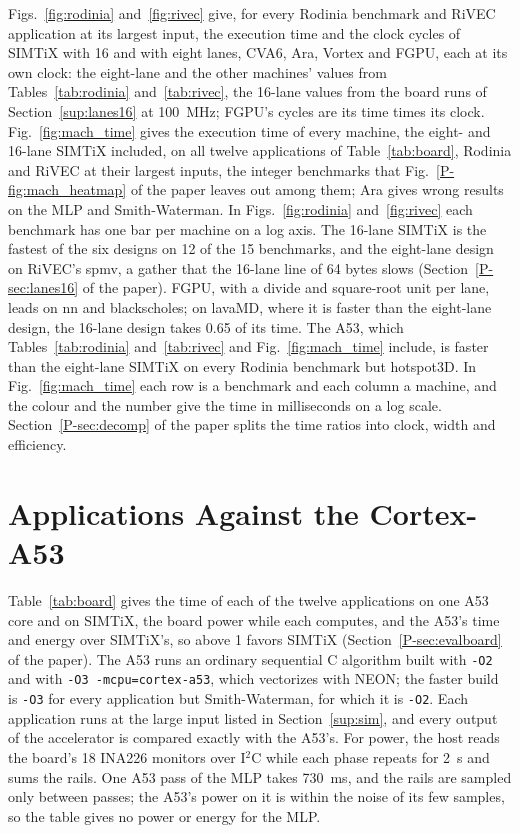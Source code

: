 \documentclass[journal]{IEEEtran}
\begin{document}
Figs.~\ref{fig:rodinia} and~\ref{fig:rivec} give, for every Rodinia benchmark and
RiVEC application at its largest input, the execution time and the clock cycles of
SIMTiX with 16 and with eight lanes, CVA6, Ara, Vortex and FGPU, each at its own clock:
the eight-lane and the other machines' values from Tables~\ref{tab:rodinia}
and~\ref{tab:rivec}, the 16-lane values from the board runs of
Section~\ref{sup:lanes16} at 100~MHz; FGPU's cycles are its time times its clock. Fig.~\ref{fig:mach_time} gives the execution time of every
machine, the eight- and 16-lane SIMTiX included, on all twelve applications of
Table~\ref{tab:board}, Rodinia and RiVEC at their largest inputs, the integer
benchmarks that Fig.~\ref{P-fig:mach_heatmap} of the paper leaves out among them; Ara
gives wrong results on the MLP and Smith-Waterman.
In Figs.~\ref{fig:rodinia} and~\ref{fig:rivec} each benchmark has one bar per machine on
a log axis. The 16-lane SIMTiX is the fastest of the six designs on 12 of the 15
benchmarks, and the eight-lane design on RiVEC's spmv, a gather that the 16-lane line of
64 bytes slows (Section~\ref{P-sec:lanes16} of the paper). FGPU, with a divide and
square-root unit per lane, leads on nn and blackscholes; on lavaMD, where it is faster
than the eight-lane design, the 16-lane design takes 0.65 of its time. The A53, which
Tables~\ref{tab:rodinia} and~\ref{tab:rivec} and Fig.~\ref{fig:mach_time} include, is
faster than the eight-lane SIMTiX on every Rodinia benchmark but hotspot3D. In Fig.~\ref{fig:mach_time} each row is a benchmark and each column a
machine, and the colour and the number give the time in milliseconds on a log scale.
Section~\ref{P-sec:decomp} of the paper splits the time ratios into clock, width and
efficiency.



\section{Applications Against the Cortex-A53}\label{sup:a53}
Table~\ref{tab:board} gives the time of each of the twelve applications on one A53 core
and on SIMTiX, the board power while each computes, and the A53's time and energy
over SIMTiX's, so above 1 favors SIMTiX (Section~\ref{P-sec:evalboard} of the paper).
The A53 runs an ordinary sequential C algorithm built with \texttt{-O2} and with
\texttt{-O3 -mcpu=cortex-a53}, which vectorizes with NEON; the faster build is
\texttt{-O3} for every application but Smith-Waterman, for which it is \texttt{-O2}.
Each application runs at the large input listed in Section~\ref{sup:sim}, and every
output of the accelerator is compared exactly with the A53's. For power, the host reads
the board's 18 INA226 monitors over I$^2$C while each phase repeats for 2~s and sums
the rails. One A53 pass of the MLP takes 730~ms, and the rails are sampled only between
passes; the A53's power on it is within the noise of its few samples, so the table
gives no power or energy for the MLP.
\end{document}
